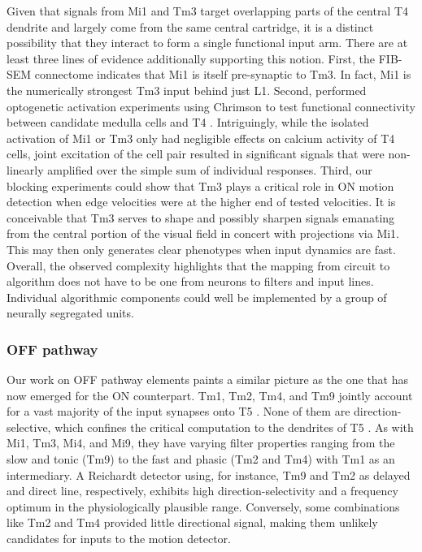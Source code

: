 Given that signals from Mi1 and Tm3 target overlapping parts of the central T4 dendrite and largely come from the same central cartridge, it is a distinct possibility that they interact to form a single functional input arm. There are at least three lines of evidence additionally supporting this notion. First, the FIB-SEM connectome indicates that Mi1 is itself pre-synaptic to Tm3. In fact, Mi1 is the numerically strongest Tm3 input behind just L1. Second, \citet{Strother:2017aa} performed optogenetic activation experiments using Chrimson to test functional connectivity between candidate medulla cells and T4 \citep{Klapoetke:2014aa}. Intriguingly, while the isolated activation of Mi1 or Tm3 only had negligible effects on calcium activity of T4 cells, joint excitation of the cell pair resulted in significant signals that were non-linearly amplified over the simple sum of individual responses. Third, our blocking experiments could show that Tm3 plays a critical role in ON motion detection when edge velocities were at the higher end of tested velocities. It is conceivable that Tm3 serves to shape and possibly sharpen signals emanating from the central portion of the visual field in concert with projections via Mi1. This may then only generates clear phenotypes when input dynamics are fast. Overall, the observed complexity highlights that the mapping from circuit to algorithm does not have to be one from neurons to filters and input lines. Individual algorithmic components could well be implemented by a group of neurally segregated units.

\subsubsection{OFF pathway}
Our work on OFF pathway elements paints a similar picture as the one that has now emerged for the ON counterpart. Tm1, Tm2, Tm4, and Tm9 jointly account for a vast majority of the input synapses onto T5 \citep{Shinomiya:2014dx}. None of them are direction-selective, which confines the critical computation to the dendrites of T5 \citep{Maisak:2013kk,Serbe:2016ew}. As with Mi1, Tm3, Mi4, and Mi9, they have varying filter properties ranging from the slow and tonic (Tm9) to the fast and phasic (Tm2 and Tm4) with Tm1 as an intermediary. A Reichardt detector using, for instance, Tm9 and Tm2 as delayed and direct line, respectively, exhibits high direction-selectivity and a frequency optimum in the physiologically plausible range. Conversely, some combinations like Tm2 and Tm4 provided little directional signal, making them unlikely candidates for inputs to the motion detector.

